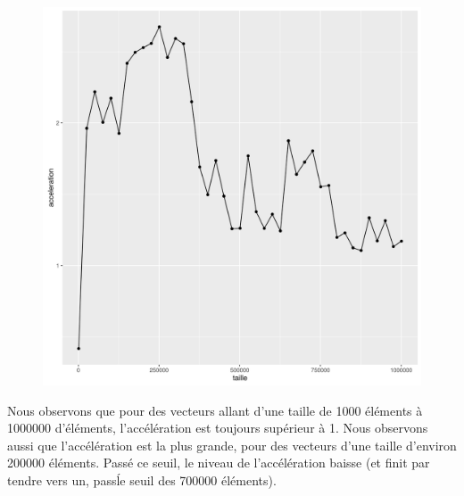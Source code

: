 \documentclass[a4paper,11pt]{scrartcl}
\begin{document}
\begin{figure}[H] \center
   \includegraphics[scale=0.5] {graphes/global_temps_machine_accel4.png}
\end{figure}

Nous observons que pour des vecteurs allant d'une taille de 1000 \'el\'ements \`a 1000000 d'\'el\'ements, l'acc\'el\'eration est toujours sup\'erieur \`a 1. Nous observons aussi que l'acc\'el\'eration est la plus grande, pour des vecteurs d'une taille d'environ 200000 \'el\'ements. Pass\'e ce seuil, le niveau de l'acc\'el\'eration baisse (et finit par tendre vers un, pass\' le seuil des 700000 \'el\'ements).   
\end{document}
